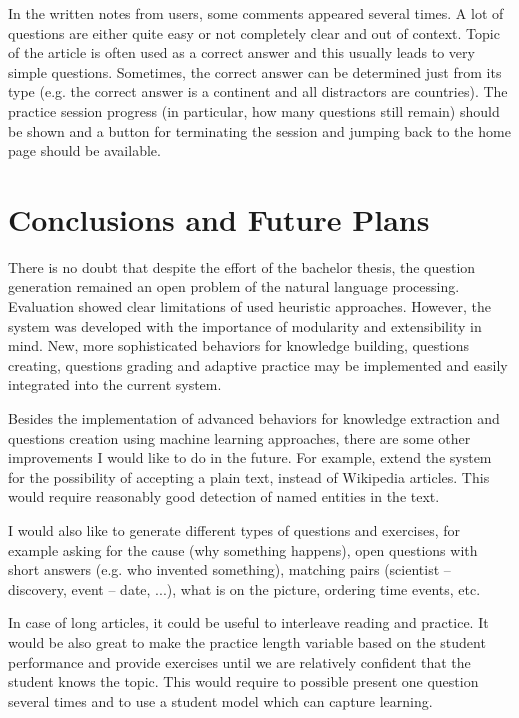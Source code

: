 \documentclass[12pt, twoside]{fithesis2}
\renewcommand{\_}{\leavevmode \kern0.07em\vbox{\hrule width0.4em}}
\newcounter{choice}
\begin{document}
In the written notes from users, some comments appeared several times.
A lot of questions are either quite easy or not completely clear and out of context.
Topic of the article is often used as a correct answer and this usually leads to very simple questions.
Sometimes, the correct answer can be determined just from its type
(e.g. the correct answer is a continent and all distractors are countries).
The practice session progress (in particular, how many questions still remain) should be shown
and a button for terminating the session and jumping back to the home page should be available.



\chapter{Conclusions and Future Plans}
\label{chap:future}

There is no doubt that despite the effort of the bachelor thesis,
the question generation remained an open problem of the natural language processing.
Evaluation showed clear limitations of used heuristic approaches.
However, the system was developed with the importance of modularity and extensibility in mind.
New, more sophisticated behaviors for knowledge building, questions creating, questions grading and adaptive practice may be implemented and easily integrated into the current system.

Besides the implementation of advanced behaviors for knowledge extraction and questions creation using machine learning approaches, there are some other improvements I would like to do in the future.
For example, extend the system for the possibility of accepting a plain text, instead of Wikipedia articles.
This would require reasonably good detection of named entities in the text.


I would also like to generate different types of questions and exercises,
for example
asking for the cause (why something happens),
open questions with short answers (e.g. who invented something),
matching pairs (scientist -- discovery,  event -- date, ...),
what is on the picture,
ordering time events, etc.

In case of long articles, it could be useful to interleave reading and practice.
It would be also great to make the practice length variable based on the student performance and provide exercises until we are relatively confident that the student knows the topic.
This would require to possible present one question several times and to use a student model which can capture learning.
\end{document}
